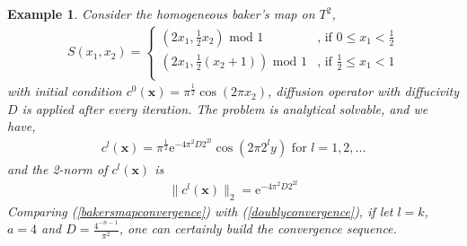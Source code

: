 \documentclass{article}
\newtheorem{example}{Example}
\begin{document}
\begin{example}
Consider the homogeneous baker's map on $T^2$,
  \begin{eqnarray}
    S(x_1,x_2) =  \left\{ \begin{array}{cc}
                 (2x_1,\frac{1}{2}x_2) \mbox{ mod } 1      &\mbox{, if } 0\le x_1 < \frac{1}{2} \\
                 (2x_1,\frac{1}{2}(x_2+1)) \mbox{ mod } 1  &\mbox{, if } \frac{1}{2}\le x_1< 1\\
              \end{array} \right.
  \end{eqnarray}
with initial condition $c^0(\mathbf{x})= \pi^{\frac{1}{2}}\cos(2 \pi
x_2)$, diffusion operator with diffucivity $D$ is applied after every iteration. The problem is analytical solvable, and we have,
  \begin{eqnarray}
   c^l(\mathbf{x}) = \pi^{\frac{1}{2}}\text{e}^{-4 \pi^2 D 2 ^{2 l}}\cos(2 \pi 2^l
   y) \mbox{ for }l = 1,2,...
  \end{eqnarray}
and the 2-norm of $c^l(\mathbf{x})$ is
  \begin{eqnarray}
  \label{bakersmapconvergence}
   \|c^l(\mathbf{x})\|_2 = \text{e}^{-4 \pi^2 D 2 ^{2 l}}
  \end{eqnarray}
Comparing (\ref{bakersmapconvergence}) with
(\ref{doublyconvergence}), if let $l=k$, $a=4$ and $D =\frac{4^{-n-1}}{\pi^2}$,
one can certainly build the convergence sequence.
\end{example}
\end{document}
